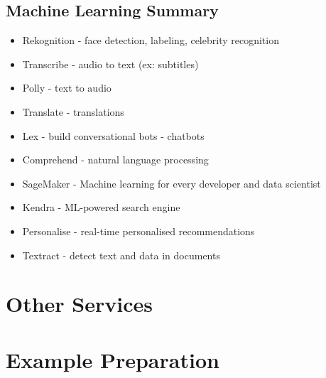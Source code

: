 \documentclass[11pt]{article}
\begin{document}
    \section{Machine Learning Summary}

    \begin{itemize}
        \item Rekognition - face detection, labeling, celebrity recognition
        \item Transcribe - audio to text (ex: subtitles)
        \item Polly - text to audio
        \item Translate - translations
        \item Lex - build conversational bots - chatbots
        \item Comprehend - natural language processing
        \item SageMaker - Machine learning for every developer and data scientist
        \item Kendra - ML-powered search engine
        \item Personalise - real-time personalised recommendations
        \item Textract - detect text and data in documents
    \end{itemize}

    \chapter{Other Services}
    \chapter{Example Preparation}
\end{document}
